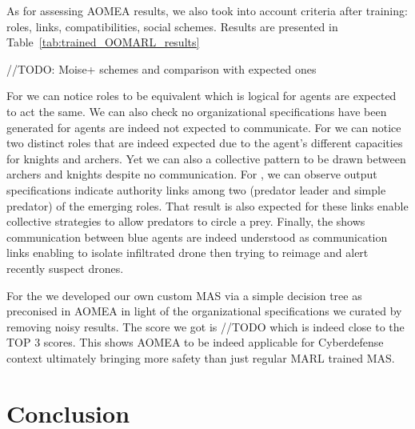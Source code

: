 \documentclass[runningheads]{llncs}
\begin{document}
As for assessing AOMEA results, we also took into account criteria after training: roles, links, compatibilities, social schemes. Results are presented in Table~\ref{tab:trained_OOMARL_results}



//TODO: Moise+ schemes and comparison with expected ones

For  we can notice roles to be equivalent which is logical for agents are expected to act the same. We can also check no organizational specifications have been generated for agents are indeed not expected to communicate. For  we can notice two distinct roles that are indeed expected due to the agent's different capacities for knights and archers. Yet we can also a collective pattern to be drawn between archers and knights despite no communication. For , we can observe output specifications indicate authority links among two (predator leader and simple predator) of the emerging roles. That result is also expected for these links enable collective strategies to allow predators to circle a prey. Finally, the  shows communication between blue agents are indeed understood as communication links enabling to isolate infiltrated drone then trying to reimage and alert recently suspect drones.

For the  we developed our own custom MAS via a simple decision tree as preconised in AOMEA in light of the organizational specifications we curated by removing noisy results. The score we got is //TODO which is indeed close to the TOP 3 scores. This shows AOMEA to be indeed applicable for Cyberdefense context ultimately bringing more safety than just regular MARL trained MAS.

\section{Conclusion}


\end{document}
